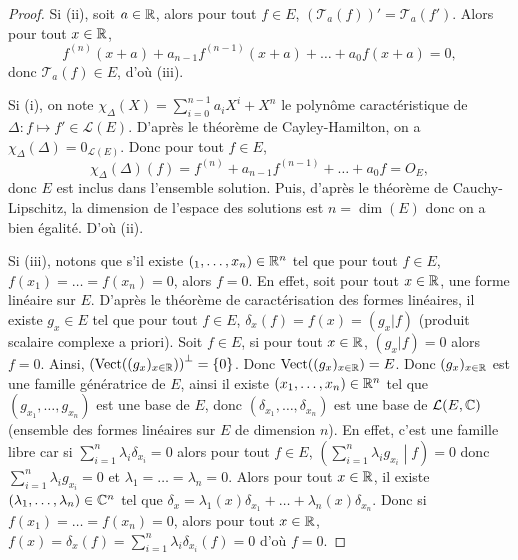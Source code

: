 \documentclass[12pt]{article}
\begin{document}
\begin{proof}
	Si (ii), soit $a\in\mathbb{R}$, alors pour tout $f\in E$, $(\mathcal{T}_a(f))'=\mathcal{T}_a(f')$. Alors pour tout $x\in\mathbb{R}$,
	\begin{equation}
		f^{(n)}(x+a)+a_{n-1}f^{(n-1)}(x+a)+\dots+a_{0}f(x+a)=0,
	\end{equation}
	donc $\mathcal{T}_{a}(f)\in E$, d'où (iii).

	Si (i), on note $\chi_{\Delta}(X)=\sum_{i=0}^{n-1}a_{i}X^{i}+X^{n}$ le polynôme caractéristique de $\Delta\colon f\mapsto f'\in\mathcal{L}(E)$. D'après le théorème de Cayley-Hamilton, on a $\chi_{\Delta}(\Delta)=0_{\mathcal{L}(E)}$. Donc pour tout $f\in E$, 
	\begin{equation}
		\chi_{\Delta}(\Delta)(f)=f^{(n)}+a_{n-1}f^{(n-1)}+\dots+a_{0}f=O_{E},
	\end{equation}
	donc $E$ est inclus dans l'ensemble solution. Puis, d'après le théorème de Cauchy-Lipschitz, la dimension de l'espace des solutions est $n=\dim(E)$ donc on a bien égalité. D'où (ii).

	Si (iii), notons que s'il existe $(_1,\dots,x_n)\in\mathbb{R}^{n}$ tel que pour tout $f\in E$, $f(x_1)=\dots=f(x_n)=0$, alors $f=0$. En effet, soit pour tout $x\in\mathbb{R}$,  une forme linéaire sur $E$.
	D'après le théorème de caractérisation des formes linéaires, il existe $g_x\in E$ tel que pour tout $f\in E$, $\delta_x(f)=f(x)=(g_x|f)$ (produit scalaire complexe a priori). Soit $f\in E$, si pour tout $x\in\mathbb{R}$, $(g_x|f)=0$ alors $f=0$. Ainsi, $\left(\operatorname{Vect}((g_x)_{x\in\mathbb{R}})\right)^{\perp}=\left\lbrace0\right\rbrace$. Donc $\operatorname{Vect}((g_x)_{x\in\mathbb{R}})=E$. Donc $(g_x)_{x\in\mathbb{R}}$ est une famille génératrice de $E$, ainsi il existe $(x_1,\dots,x_n)\in\mathbb{R}^{n}$ tel que $(g_{x_1},\dots,g_{x_n})$ est une base de $E$, donc $(\delta_{x_1},\dots,\delta_{x_n})$ est une base de $\mathcal{L}(E,\mathbb{C})$ (ensemble des formes linéaires sur $E$ de dimension $n$). En effet, c'est une famille libre car si $\sum_{i=1}^{n}\lambda_i \delta_{x_i}=0$ alors pour tout $f\in E$, $\left(\sum_{i=1}^{n}\lambda_i g_{x_i}\middle| f\right)=0$ donc $\sum_{i=1}^{n}\lambda_i g_{x_i}=0$ et $\lambda_1=\dots=\lambda_n=0$.
	Alors pour tout $x\in\mathbb{R}$, il existe $(\lambda_1,\dots,\lambda_n)\in\mathbb{C}^{n}$ tel que $\delta_x=\lambda_1(x)\delta_{x_1}+\dots+\lambda_n(x)\delta_{x_n}$. Donc si $f(x_1)=\dots=f(x_n)=0$, alors pour tout $x\in\mathbb{R}$, $f(x)=\delta_x(f)=\sum_{i=1}^{n}\lambda_i\delta_{x_i}(f)=0$ d'où $f=0$.


\end{proof}
\end{document}
